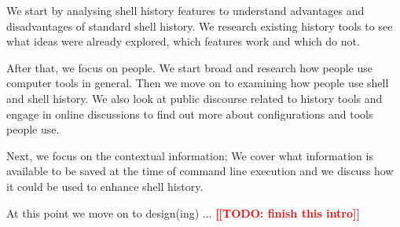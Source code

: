 \documentclass[thesis=M,english]{FITthesis}[2012/10/20]
\newcommand{\blind}[1][1]{}
\newcommand{\todotext}[1]{\textcolor{red}{\textbf{[[#1]]}}}
\begin{document}
\begin{introduction}


 We start by analysing shell history features to understand advantages and disadvantages of standard shell history. We research existing history tools to see what ideas were already explored, which features work and which do not. 

After that, we focus on people. We start broad and research how people use computer tools in general. Then we move on to examining how people use shell and shell history. We also look at public discourse related to history tools and engage in online discussions to find out more about configurations and tools people use.

Next, we focus on the contextual information; We cover what information is available to be saved at the time of command line execution and we discuss how it could be used to enhance shell history. 

At this point we move on to design(ing) ...
\todotext{TODO: finish this intro}


\blind[2]

\end{introduction}






\end{document}
